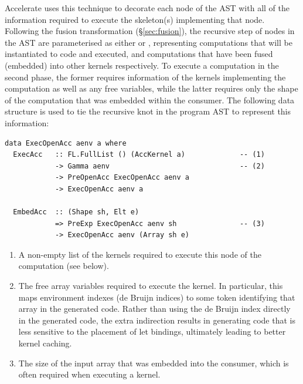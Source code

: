 Accelerate uses this technique to decorate each node of the AST with all of the
information required to execute the skeleton(s) implementing that node.
Following the fusion transformation (\S\ref{sec:fusion}), the recursive step of
nodes in the AST are parameterised as either  or ,
representing computations that will be instantiated to \CUDA code and executed,
and computations that have been fused (embedded) into other kernels
respectively. To execute a computation in the second phase, the former requires
information of the kernels implementing the computation as well as any free
variables, while the latter requires only the shape of the computation that was
embedded within the consumer. The following data structure is used to tie the
recursive knot in the program AST to represent this information:
%
\begin{lstlisting}[style=haskell]
data ExecOpenAcc aenv a where
  ExecAcc   :: FL.FullList () (AccKernel a)             -- (1)
            -> Gamma aenv                               -- (2)
            -> PreOpenAcc ExecOpenAcc aenv a
            -> ExecOpenAcc aenv a

  EmbedAcc  :: (Shape sh, Elt e)
            => PreExp ExecOpenAcc aenv sh               -- (3)
            -> ExecOpenAcc aenv (Array sh e)
\end{lstlisting}
%
\begin{enumerate}
\item A non-empty list of the kernels required to execute this node of the
    computation (see below).

\item The free array variables required to execute the kernel. In particular,
    this maps environment indexes (de Bruijn indices) to some token identifying
    that array in the generated code. Rather than using the de Bruijn index
    directly in the generated code, the extra indirection results in generating
    code that is less sensitive to the placement of let bindings, ultimately
    leading to better kernel caching.

\item The size of the input array that was embedded into the consumer, which is
    often required when executing a kernel.
\end{enumerate}

